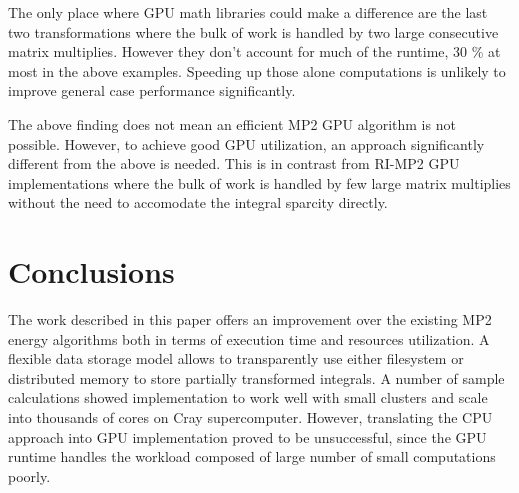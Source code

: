 \documentclass[12pt]{article} \usepackage[margin=1in]{geometry}
\begin{document}
The only place where GPU math libraries could make a difference are
the last two transformations where the bulk of work is handled by two
large consecutive matrix multiplies.  However they don't account for
much of the runtime, 30 \% at most in the above examples.  Speeding up
those alone computations is unlikely to improve general case
performance significantly. 

 The above finding does not mean an efficient MP2 GPU algorithm is not
 possible.  However, to achieve good GPU utilization, an approach
 significantly different from the above is needed.  This is in
 contrast from RI-MP2 GPU implementations \cite{watson2010accelerating} where the bulk of work is
 handled by few large matrix multiplies without the need to accomodate
the  integral sparcity directly.

\section{Conclusions}
The work described in this paper offers an improvement over the
existing MP2 energy algorithms both in terms of execution time and
resources utilization. A flexible data storage model allows to
transparently use either filesystem or distributed memory to store
partially transformed integrals.  A number of sample calculations
showed implementation to work well with small clusters and scale into
thousands of cores on Cray supercomputer.  However, translating the
CPU approach into GPU implementation proved to be unsuccessful, since
the GPU runtime handles the workload composed of large number of small
computations poorly.



\end{document}
